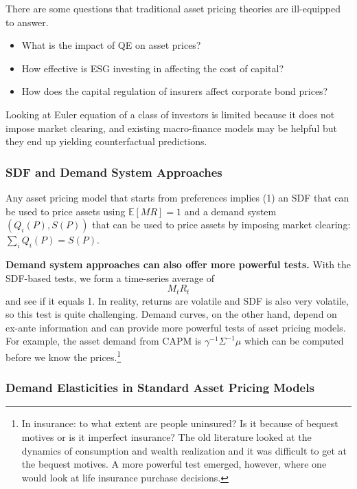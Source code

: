 \documentclass[
]{book}
\providecommand{\tightlist}{%
  \setlength{\itemsep}{0pt}\setlength{\parskip}{0pt}}
\begin{document}
There are some questions that traditional asset pricing theories are ill-equipped to answer.

\begin{itemize}
\tightlist
\item
  What is the impact of QE on asset prices?
\item
  How effective is ESG investing in affecting the cost of capital?
\item
  How does the capital regulation of insurers affect corporate bond prices?
\end{itemize}

Looking at Euler equation of a class of investors is limited because it does not impose market clearing, and existing macro-finance models may be helpful but they end up yielding counterfactual predictions.

\hypertarget{sdf-and-demand-system-approaches}{%
\subsubsection{SDF and Demand System Approaches}\label{sdf-and-demand-system-approaches}}

Any asset pricing model that starts from preferences implies (1) an SDF that can be used to price assets using \(\mathbb{E}[MR]=1\) and a demand system \((Q_i(P),S(P))\) that can be used to price assets by imposing market clearing: \(\sum_i Q_i(P) = S(P)\).

\textbf{Demand system approaches can also offer more powerful tests.} With the SDF-based tests, we form a time-series average of \[M_t R_t\] and see if it equals 1. In reality, returns are volatile and SDF is also very volatile, so this test is quite challenging. Demand curves, on the other hand, depend on ex-ante information and can provide more powerful tests of asset pricing models. For example, the asset demand from CAPM is \(\gamma^{-1} \Sigma^{-1} \mu\) which can be computed before we know the prices.\footnote{In insurance: to what extent are people uninsured? Is it because of bequest motives or is it imperfect insurance? The old literature looked at the dynamics of consumption and wealth realization and it was difficult to get at the bequest motives. A more powerful test emerged, however, where one would look at life insurance purchase decisions.}

\hypertarget{demand-elasticities-in-standard-asset-pricing-models}{%
\subsubsection{Demand Elasticities in Standard Asset Pricing Models}\label{demand-elasticities-in-standard-asset-pricing-models}}
\end{document}
